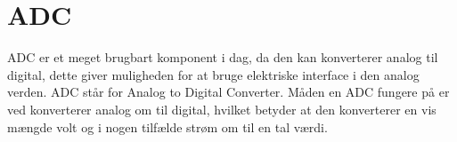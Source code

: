 \section{ADC}

ADC er et meget brugbart komponent i dag, da den kan konverterer analog til digital, dette giver muligheden for at bruge elektriske interface i den analog verden. 
ADC står for Analog to Digital Converter. 
Måden en ADC fungere på er ved konverterer analog om til digital, hvilket betyder at den konverterer en vis mængde volt og i nogen tilfælde strøm om til en tal værdi. 

